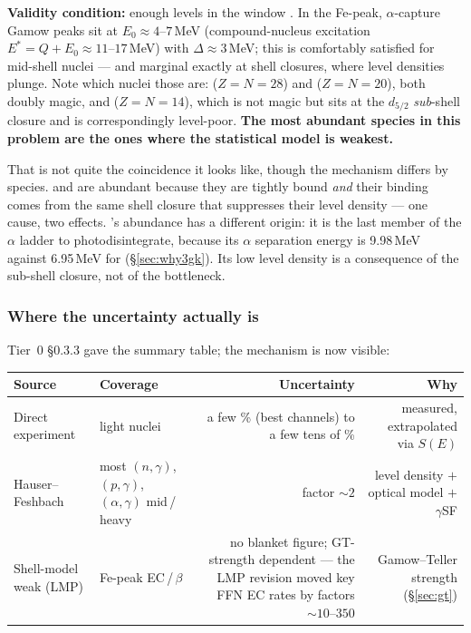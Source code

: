 \textbf{Validity condition:} enough levels in the window
\citep{rauscher1997}. In the Fe-peak, $\alpha$-capture Gamow peaks sit at
$E_0 \approx 4$--$7$\,MeV (compound-nucleus excitation $E^* = Q + E_0 \approx
11$--$17$\,MeV) with $\Delta \approx 3$\,MeV; this is comfortably satisfied for
mid-shell nuclei --- and marginal exactly at shell closures, where level
densities plunge. Note which nuclei those are:  ($Z = N = 28$) and
 ($Z = N = 20$), both doubly magic, and  ($Z = N = 14$),
which is not magic but sits at the $d_{5/2}$ \emph{sub}-shell closure and is
correspondingly level-poor. \textbf{The most abundant species in this problem
are the ones where the statistical model is weakest.}

That is not quite the coincidence it looks like, though the mechanism differs by
species.  and  are abundant because they are tightly
bound \emph{and} their binding comes from the same shell closure that suppresses
their level density --- one cause, two effects. 's abundance has a
different origin: it is the last member of the $\alpha$ ladder to
photodisintegrate, because its $\alpha$ separation energy is 9.98\,MeV against
6.95\,MeV for  (\S\ref{sec:why3gk}). Its low level density is a
consequence of the sub-shell closure, not of the bottleneck.

\subsubsection{Where the uncertainty actually is}
\label{sec:uncertainty}

Tier~0 \S0.3.3 gave the summary table; the mechanism is now visible:

\begin{center}
\begin{tabularx}{\textwidth}{@{}L{2.9cm} L{2.4cm} R{1.2} R{0.8}@{}}
\toprule
\textbf{Source} & \textbf{Coverage} & \textbf{Uncertainty} & \textbf{Why} \\
\midrule
Direct experiment & light nuclei &
  a few \% (best channels) to a few tens of \% &
  measured, extrapolated via $S(E)$ \\
Hauser--Feshbach & most $(n,\gamma)$, $(p,\gamma)$, $(\alpha,\gamma)$
  mid\,/\,heavy &
  factor ${\sim}2$ \citep{rauscher2000} &
  level density $+$ optical model $+$ $\gamma$SF \\
Shell-model weak (LMP) & Fe-peak EC\,/\,$\beta$ &
  no blanket figure; GT-strength dependent --- the LMP revision moved key FFN
  EC rates by factors ${\sim}10$--$350$ \citep{langanke2000} &
  Gamow--Teller strength (\S\ref{sec:gt}) \\
\bottomrule
\end{tabularx}
\end{center}


